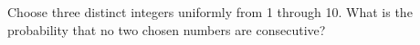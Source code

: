 Choose three distinct integers uniformly from 1 through 10. What is the probability that no two chosen numbers are consecutive?
